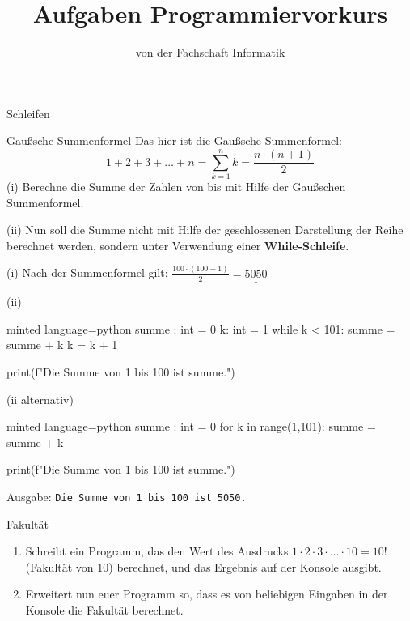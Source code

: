 
\title{Aufgaben Programmiervorkurs}
\subtitle{von der Fachschaft Informatik\hfill\ptitle}

\maketitle{}

\begin{task}[points=auto]{Schleifen}
    \begin{subtask*}[points=0]{Gaußsche Summenformel }
        Das hier ist die Gaußsche Summenformel:
        $$1+2+3+\ldots+n = \sum_{k=1}^nk=\frac{n\cdot(n+1)}{2}$$
        (i) Berechne die Summe der Zahlen von  bis  mit Hilfe der Gaußschen Summenformel.

        (ii) Nun soll die Summe nicht mit Hilfe der geschlossenen Darstellung der Reihe berechnet werden, sondern unter Verwendung einer \textbf{While-Schleife}.

        \begin{solution}
            (i) Nach der Summenformel gilt: $\frac{100\cdot(100+1)}{2} = \underline{\underline{5050}}$

            (ii) \begin{codeBlock}[]{minted language=python}
                summe : int = 0
                k: int = 1
                while k < 101:
                    summe = summe + k
                    k = k + 1

                print(f"Die Summe von 1 bis 100 ist {summe}.")
            \end{codeBlock}

            (ii alternativ) \begin{codeBlock}[]{minted language=python}
                summe : int = 0
                for k in range(1,101):
                    summe = summe + k

                print(f"Die Summe von 1 bis 100 ist {summe}.")
            \end{codeBlock}
            Ausgabe: \texttt{Die Summe von 1 bis 100 ist 5050.}
        \end{solution}
    \end{subtask*}
    \begin{subtask*}[points=0]{Fakultät }
        \begin{enumerate}
            \item Schreibt ein Programm, das den Wert des Ausdrucks $1 \cdot 2 \cdot 3 \cdot \ldots \cdot 10 = 10!$ (Fakultät von 10) berechnet, und das Ergebnis auf der Konsole ausgibt.
            \item Erweitert nun euer Programm so, dass es von beliebigen Eingaben in der Konsole die Fakultät berechnet.
        \end{enumerate}


\end{subtask*}
\end{task}
